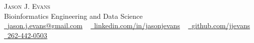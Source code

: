 \documentclass[letterpaper,11pt]{article}
\begin{document}
    \begin{center}
        {\Huge\scshape Jason J. Evans} 
        \\Bioinformatics Engineering and Data Science\\
        \small
        \href{mailto:jason.j.evans@gmail.com}{\raisebox{-0.2\height}\faEnvelope\  \underline{jason.j.evans@gmail.com}} ~ 
        \href{https://www.linkedin.com/in/jasonjevans/}{\raisebox{-0.2\height}\faLinkedin\ \underline{linkedin.com/in/jasonjevans}}  ~
        \href{https://github.com/jjevans}{\raisebox{-0.2\height}\faGithub\ \underline{github.com/jjevans}} ~
		\href{tel:12624420503}{\raisebox{-0.2\height}\faPhone\ \underline{262-442-0503}}
    \end{center}

\end{document}
